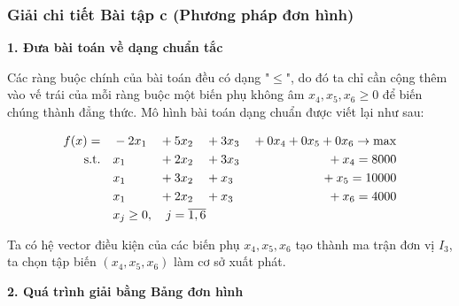\subsubsection{Giải chi tiết Bài tập c (Phương pháp đơn hình)}

\textbf{1. Đưa bài toán về dạng chuẩn tắc}

Các ràng buộc chính của bài toán đều có dạng "$\le$", do đó ta chỉ cần cộng thêm vào vế trái của mỗi ràng buộc một biến phụ không âm $x_4, x_5, x_6 \ge 0$ để biến chúng thành đẳng thức.
Mô hình bài toán dạng chuẩn được viết lại như sau:

\begin{alignat*}{4}
    f(x) = \quad & -2x_1 & {}+{} & 5x_2 & {}+{} & 3x_3 & {}+{} 0x_4 + 0x_5 + 0x_6 \rightarrow \max \\
    \text{s.t.} \quad & x_1 & {}+{} & 2x_2 & {}+{} & 3x_3 & {}+{} x_4 = 8000 \\
    & x_1 & {}+{} & 3x_2 & {}+{} & x_3 & {}+{} x_5 = 10000 \\
    & x_1 & {}+{} & 2x_2 & {}+{} & x_3 & {}+{} x_6 = 4000 \\
    & \rlap{$x_j \ge 0, \quad j = \overline{1,6}$}
\end{alignat*}

Ta có hệ vector điều kiện của các biến phụ $x_4, x_5, x_6$ tạo thành ma trận đơn vị $I_3$, ta chọn tập biến $(x_4, x_5, x_6)$ làm cơ sở xuất phát.

\vspace{0.3cm}
\textbf{2. Quá trình giải bằng Bảng đơn hình}

